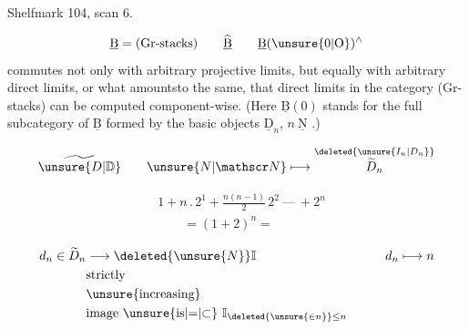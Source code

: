 Shelfmark 104, scan 6.


\[
\underline{\mathrm B}=(\text{Gr-stacks})\qquad
\widehat{\underline{\mathrm B}}\qquad
\underline{\mathrm B}(\unsure{0|\mathrm O})^{\wedge}
\]
commutes not only with arbitrary projective limits, but equally with arbitrary direct limits, or what amountsto the same, that direct limits in the category (Gr-stacks) can be computed component-wise. (Here \(\underline{\mathrm B}(0)\) stands for the full subcategory of \(\underline{\mathrm B}\) formed by the basic objects \(\underline{\mathrm D}_n\), \(n\ \underline{\mathrm N}\) .)

\[
\widetilde{\unsure{D|\mathbb D}}\qquad
\unsure{N|\mathscr N}\longmapsto
\overset{\deleted{\unsure{I_n|D_n}}}{\widetilde D_n}
\]

\[
\begin{aligned}
&1+n\mathbin{.}2^1+\frac{n(n-1)}{2}\,2^2\ \text{---}\ +2^n\\
&\qquad=(1+2)^n=
\end{aligned}
\]

\[
\begin{aligned}
d_n\in\widetilde D_n&\longrightarrow\deleted{\unsure{N}}\mathbb I
 &\qquad d_n&\longmapsto n\\
&\text{strictly}\\
&\text{\unsure{increasing}}\\
&\text{image \unsure{is|\(=\)|\(\subset\)}}\ \mathbb I_{\deleted{\unsure{\in n}}\leq n}
\end{aligned}
\]


